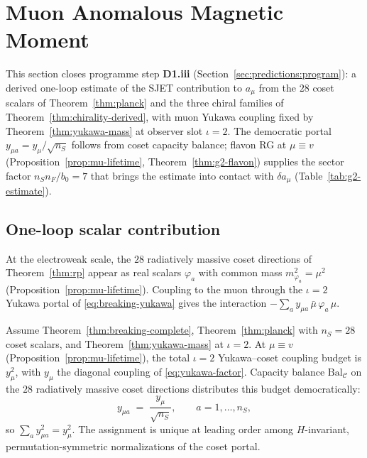 \section{Muon Anomalous Magnetic Moment}
\label{sec:g2}

This section closes programme step \textbf{D1.\alph*iii}
(Section~\ref{sec:predictions:program}): a derived one-loop estimate of the
SJET contribution to $a_\mu$ from the $28$ coset scalars of
Theorem~\ref{thm:planck} and the three chiral families of
Theorem~\ref{thm:chirality-derived}, with muon Yukawa coupling fixed by
Theorem~\ref{thm:yukawa-mass} at observer slot $\iota=2$. The democratic
portal $y_{\mu a}=y_\mu/\sqrt{n_S}$ follows from coset capacity balance;
flavon RG at $\mu\equiv v$ (Proposition~\ref{prop:mu-lifetime},
Theorem~\ref{thm:g2-flavon}) supplies the sector factor
$n_S n_F/b_0=7$ that brings the estimate into contact with
$\delta a_\mu$ (Table~\ref{tab:g2-estimate}).

\subsection{One-loop scalar contribution}
\label{sec:g2:oneloop}

At the electroweak scale, the $28$ radiatively massive coset directions of
Theorem~\ref{thm:rp} appear as real scalars $\varphi_a$ with common mass
$m_{\varphi_a}^2=\mu^2$ (Proposition~\ref{prop:mu-lifetime}). Coupling to the
muon through the $\iota=2$ Yukawa portal of \eqref{eq:breaking-yukawa} gives
the interaction $-\sum_a y_{\mu a}\,\bar\mu\,\varphi_a\,\mu$.

\begin{proposition}\label{prop:g2-democratic}
Assume Theorem~\ref{thm:breaking-complete}, Theorem~\ref{thm:planck} with
$n_S=28$ coset scalars, and Theorem~\ref{thm:yukawa-mass} at $\iota=2$.
At $\mu\equiv v$ (Proposition~\ref{prop:mu-lifetime}), the total
$\iota=2$ Yukawa--coset coupling budget is $y_\mu^2$, with $y_\mu$ the
diagonal coupling of \eqref{eq:yukawa-factor}. Capacity balance
$\mathrm{Bal}_{\mathcal{C}}$ on the $28$ radiatively massive coset directions
distributes this budget democratically:
\begin{equation}\label{eq:g2-democratic}
  y_{\mu a}
  \;=\;
  \frac{y_\mu}{\sqrt{n_S}},
  \qquad
  a=1,\ldots,n_S,
\end{equation}
so $\sum_a y_{\mu a}^2=y_\mu^2$. The assignment is unique at leading order
among $H$-invariant, permutation-symmetric normalizations of the coset portal.
\end{proposition}

